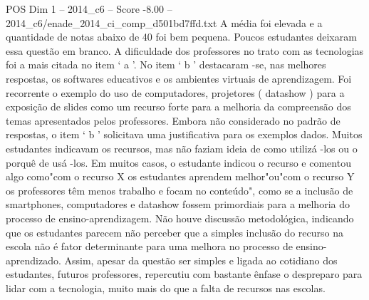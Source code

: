 \begin{textsample}{POS Dim 1 – 2014\_c6 – Score -8.00 – 2014\_c6/enade\_2014\_ci\_comp\_d501bd7ffd.txt}
A média foi elevada e a quantidade de notas abaixo de 40 foi bem pequena.
Poucos estudantes deixaram essa questão em branco.
A dificuldade dos professores no trato com as tecnologias foi a mais citada no item ‘ a ’.
No item ‘ b ’ destacaram -se, nas melhores respostas, os softwares educativos e os ambientes virtuais de aprendizagem.
Foi recorrente o exemplo do uso de computadores, projetores ( datashow ) para a exposição de slides como um recurso forte para a melhoria da compreensão dos temas apresentados pelos professores.
Embora não considerado no padrão de respostas, o item ‘ b ’ solicitava uma justificativa para os exemplos dados.
Muitos estudantes indicavam os recursos, mas não faziam ideia de como utilizá -los ou o porquê de usá -los.
Em muitos casos, o estudante indicou o recurso e comentou algo como"com o recurso X os estudantes aprendem melhor"ou"com o recurso Y os professores têm menos trabalho e focam no conteúdo", como se a inclusão de smartphones, computadores e datashow fossem primordiais para a melhoria do processo de ensino-aprendizagem.
Não houve discussão metodológica, indicando que os estudantes parecem não perceber que a simples inclusão do recurso na escola não é fator determinante para uma melhora no processo de ensino-aprendizado.
Assim, apesar da questão ser simples e ligada ao cotidiano dos estudantes, futuros professores, repercutiu com bastante ênfase o despreparo para lidar com a tecnologia, muito mais do que a falta de recursos nas escolas.

\end{textsample}
